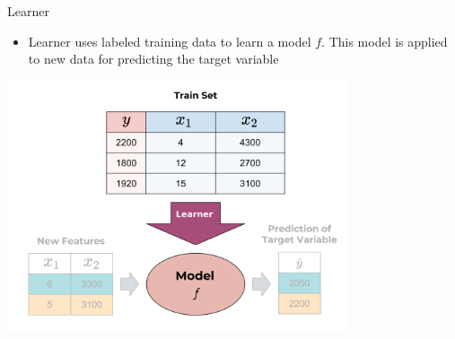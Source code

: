 \documentclass[11pt,compress,t,notes=noshow, xcolor=table]{beamer}
\begin{document}
\begin{vbframe}{Learner}
\newpage

\begin{itemize}
\item Learner uses labeled training data to learn a model $f$. This model is applied to new data for predicting the target variable
\end{itemize}

 \begin{center}
    \includegraphics[width = 0.75\textwidth]{figure_man/the_inducer_web.png}
  \end{center}

\end{vbframe}
\end{document}
